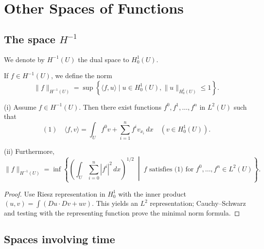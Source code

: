 \section{Other Spaces of Functions}
\label{sec:other-spaces-of-functions}

\subsection{The space $H^{-1}$}

\begin{definition}
\label{def:dual-space-h-minus-1}
We denote by $H^{-1}(U)$ the dual space to $H_0^1(U)$.
\end{definition}

\begin{definition}[Norm on $H^{-1}(U)$]
\label{def:norm-on-h-minus-1}
If $f \in H^{-1}(U)$, we define the norm
$$\|f\|_{H^{-1}(U)} = \sup\left\{\langle f,u\rangle \mid u \in H_0^1(U), \|u\|_{H_0^1(U)} \le 1\right\}.$$
\end{definition}

\begin{theorem}[Characterization of $H^{-1}$]
\label{thm:characterization-h-minus-1}
(i) Assume $f \in H^{-1}(U)$. Then there exist functions $f^0, f^1, \ldots, f^n$ in $L^2(U)$ such that
$$(1) \quad \langle f,v \rangle = \int_U f^0 v + \sum_{i=1}^n f^i v_{x_i}\,dx \quad (v \in H_0^1(U)).$$

(ii) Furthermore,
$$\|f\|_{H^{-1}(U)} = \inf\left\{\left(\int_U \sum_{i=0}^n |f^i|^2\,dx\right)^{1/2} \;\middle|\; f \text{ satisfies (1) for } f^0,\ldots,f^n \in L^2(U)\right\}.$$
\end{theorem}

\begin{proof}
\sketch Use Riesz representation in $H_0^1$ with the inner product $(u,v)=\int(Du\cdot Dv+uv)$. This yields an $L^2$ representation; Cauchy--Schwarz and testing with the representing function prove the minimal norm formula.
\end{proof}

\subsection{Spaces involving time}

